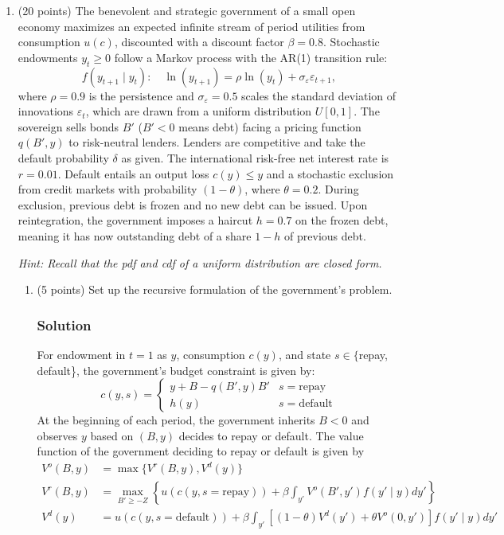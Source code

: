 \documentclass[12pt]{article}
\begin{document}
\begin{enumerate}
    \item (20 points) The benevolent and strategic government of a small open economy maximizes an expected infinite stream of period utilities from consumption $u(c)$, discounted with a discount factor $\beta = 0.8$. Stochastic endowments $y_t \geq 0$ follow a Markov process with the AR(1) transition rule:
    \[
    f(y_{t+1} \mid y_t): \quad \ln(y_{t+1}) = \rho \ln(y_t) + \sigma_\varepsilon \varepsilon_{t+1},
    \]
    where $\rho = 0.9$ is the persistence and $\sigma_\varepsilon = 0.5$ scales the standard deviation of innovations $\varepsilon_t$, which are drawn from a uniform distribution $U[0, 1]$. The sovereign sells bonds $B'$ ($B' < 0$ means debt) facing a pricing function $q(B', y)$ to risk-neutral lenders. Lenders are competitive and take the default probability $\delta$ as given. The international risk-free net interest rate is $r = 0.01$. Default entails an output loss $c(y) \leq y$ and a stochastic exclusion from credit markets with probability $(1 - \theta)$, where $\theta = 0.2$. During exclusion, previous debt is frozen and no new debt can be issued. Upon reintegration, the government imposes a haircut $h = 0.7$ on the frozen debt, meaning it has now outstanding debt of a share $1 - h$ of previous debt. 

    \textit{Hint: Recall that the pdf and cdf of a uniform distribution are closed form.}

    \begin{enumerate}%
        \item (5 points) Set up the recursive formulation of the government’s problem.
        \subsubsection*{Solution}

        For endowment in $t=1$ as $y$, consumption $c(y)$, and state $s\in \{$repay, default\}, the government's budget constraint is given by:
        \[ c(y,s) = \begin{cases}
            y + B - q(B',y)B' & s=\text{repay}
            \\ h(y) & s=\text{default}
        \end{cases} 
        \]
        At the beginning of each period, the government inherits $B<0$ and observes $y$ based on $(B,y)$ decides to repay or default. The value function of the government deciding to repay or default is given by 
        \begin{align*}
            V^o(B,y) &= \max \{V^r(B,y), V^d(y)\}
            \\ V^r(B,y) &= \max_{B' \geq -Z} \left\{u(c(y,s=\text{repay}))+ \beta \int_{y'}  V^o(B',y') f(y' \mid y)dy' \right\}
            \\ V^d(y) &=  u(c(y,s=\text{default})) + \beta \int_{y'}  \left[ (1-\theta)V^d(y') + \theta V^o(0,y') \right] f(y' \mid y) dy'
        \end{align*}


\end{enumerate}
\end{enumerate}
\end{document}
